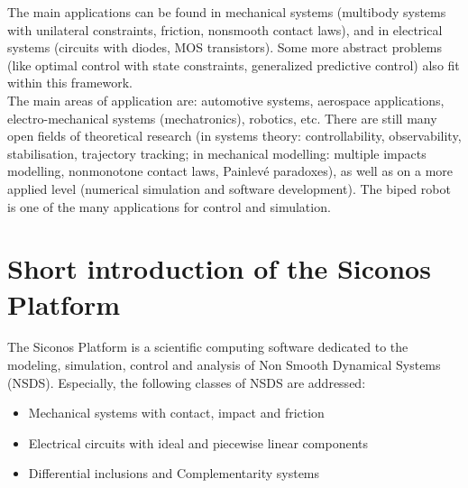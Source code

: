 The main applications can be found in mechanical systems (multibody systems with unilateral constraints, friction, nonsmooth contact laws), and in electrical systems (circuits with diodes, MOS transistors). Some more abstract problems (like optimal control with state constraints, generalized predictive control) also fit within this framework.\\

The main areas of application are: automotive systems, aerospace applications, electro-mechanical systems (mechatronics), robotics, etc. There are still many open fields of theoretical research (in systems theory: controllability, observability, stabilisation, trajectory tracking; in mechanical modelling: multiple impacts modelling, nonmonotone contact laws, Painlevé paradoxes), as well as on a more applied level (numerical simulation and software development). The biped robot is one of the many applications for control and simulation.\\


\section{Short introduction of the Siconos Platform}

The Siconos Platform is a scientific computing software dedicated to the modeling, simulation, control and analysis of Non Smooth Dynamical Systems (NSDS). Especially, the following classes of NSDS are addressed:

\begin{itemize}
\item Mechanical systems with contact, impact and friction
\item Electrical circuits with ideal and piecewise linear components
\item Differential inclusions and Complementarity systems
\end{itemize}






